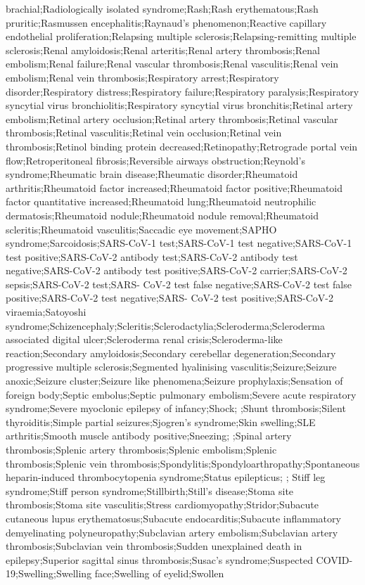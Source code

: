 \begin{refsection}
\begin{tcolorbox}[quote]
brachial;Radiologically isolated syndrome;Rash;Rash erythematous;Rash pruritic;Rasmussen encephalitis;Raynaud's phenomenon;Reactive capillary endothelial proliferation;Relapsing multiple sclerosis;Relapsing-remitting multiple sclerosis;Renal amyloidosis;Renal arteritis;Renal artery thrombosis;Renal embolism;Renal failure;Renal vascular thrombosis;Renal vasculitis;Renal vein embolism;Renal vein thrombosis;Respiratory arrest;Respiratory disorder;Respiratory distress;Respiratory failure;Respiratory paralysis;Respiratory syncytial virus bronchiolitis;Respiratory syncytial virus bronchitis;Retinal artery embolism;Retinal artery occlusion;Retinal artery thrombosis;Retinal vascular thrombosis;Retinal vasculitis;Retinal vein occlusion;Retinal vein thrombosis;Retinol binding protein decreased;Retinopathy;Retrograde portal vein flow;Retroperitoneal fibrosis;Reversible airways obstruction;Reynold's syndrome;Rheumatic brain disease;Rheumatic disorder;Rheumatoid arthritis;Rheumatoid factor increased;Rheumatoid factor positive;Rheumatoid factor quantitative increased;Rheumatoid lung;Rheumatoid neutrophilic dermatosis;Rheumatoid nodule;Rheumatoid nodule removal;Rheumatoid scleritis;Rheumatoid vasculitis;Saccadic eye movement;SAPHO syndrome;Sarcoidosis;SARS-CoV-1 test;SARS-CoV-1 test negative;SARS-CoV-1 test positive;SARS-CoV-2 antibody test;SARS-CoV-2 antibody test negative;SARS-CoV-2 antibody test positive;SARS-CoV-2 carrier;SARS-CoV-2 sepsis;SARS-CoV-2 test;SARS- CoV-2 test false negative;SARS-CoV-2 test false positive;SARS-CoV-2 test negative;SARS- CoV-2 test positive;SARS-CoV-2 viraemia;Satoyoshi syndrome;Schizencephaly;Scleritis;Sclerodactylia;Scleroderma;Scleroderma associated digital ulcer;Scleroderma renal crisis;Scleroderma-like reaction;Secondary amyloidosis;Secondary cerebellar degeneration;Secondary progressive multiple sclerosis;Segmented hyalinising vasculitis;Seizure;Seizure anoxic;Seizure cluster;Seizure like phenomena;Seizure prophylaxis;Sensation of foreign body;Septic embolus;Septic pulmonary embolism;Severe acute respiratory syndrome;Severe myoclonic epilepsy of infancy;Shock; ;Shunt thrombosis;Silent thyroiditis;Simple partial seizures;Sjogren's syndrome;Skin swelling;SLE arthritis;Smooth muscle antibody positive;Sneezing; ;Spinal artery thrombosis;Splenic artery thrombosis;Splenic embolism;Splenic thrombosis;Splenic vein thrombosis;Spondylitis;Spondyloarthropathy;Spontaneous heparin-induced thrombocytopenia syndrome;Status epilepticus; ;  Stiff leg syndrome;Stiff person syndrome;Stillbirth;Still's disease;Stoma site thrombosis;Stoma site vasculitis;Stress cardiomyopathy;Stridor;Subacute cutaneous lupus erythematosus;Subacute endocarditis;Subacute inflammatory demyelinating polyneuropathy;Subclavian artery embolism;Subclavian artery thrombosis;Subclavian vein thrombosis;Sudden unexplained death in epilepsy;Superior sagittal sinus thrombosis;Susac's syndrome;Suspected COVID- 19;Swelling;Swelling face;Swelling of eyelid;Swollen 
\end{tcolorbox}
\end{refsection}
